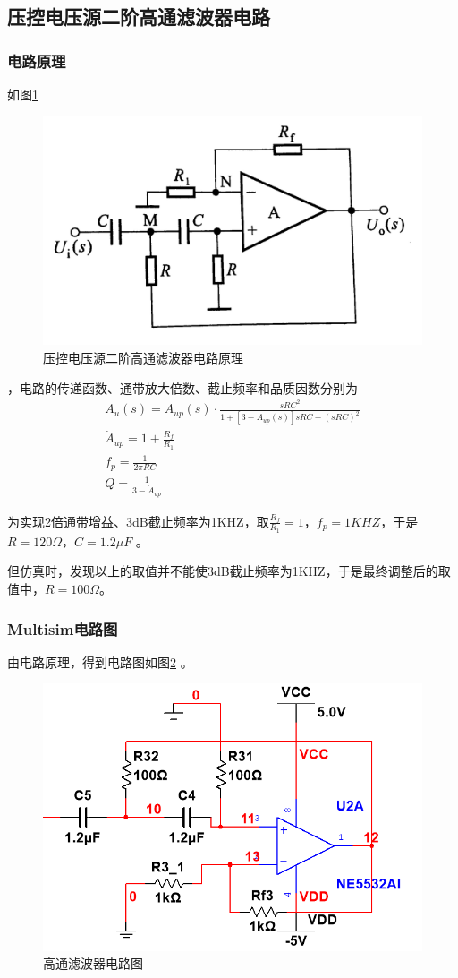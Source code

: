 \documentclass[12pt]{article}
\begin{document}
\subsection{压控电压源二阶高通滤波器电路}
\subsubsection{电路原理}
如图\ref{yjdtlbq11}
\begin{figure}[htbp]
  \centering
  \includegraphics[width=.5\textwidth]{picture/P3}
  \caption{压控电压源二阶高通滤波器电路原理}\label{yjdtlbq11}
\end{figure}
，电路的传递函数、通带放大倍数、截止频率和品质因数分别为
\begin{gather}
		A_u(s)=A_{up}(s)\cdot\frac{sRC^2}{1+\left[3-A_{up}(s)\right]sRC+\left(sRC\right)^2}\\
		\dot{A}_{up}=1+\frac{R_f}{R_1}\\
        f_p=\frac{1}{2\pi RC}\\
        Q=\frac{1}{3-\dot{A}_{up}}
	\end{gather}\par
为实现2倍通带增益、3dB截止频率为1KHZ，取$\frac{R_f}{R_1}=1$，$f_p=1KHZ$，于是$R=120\Omega$，$C=1.2\mu F$
。\par
但仿真时，发现以上的取值并不能使3dB截止频率为1KHZ，于是最终调整后的取值中，$R=100\Omega$。
\subsubsection{Multisim电路图}
由电路原理，得到电路图如图\ref{qzzydlt1133}
。
\begin{figure}[htbp]
  \centering
  \includegraphics[width=.6\textwidth]{picture/TIM20190505134645}
  \caption{高通滤波器电路图}\label{qzzydlt1133}
\end{figure}
\end{document}
